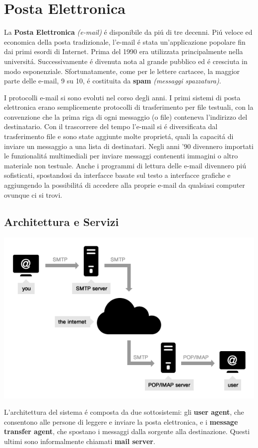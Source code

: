 \documentclass[12pt]{article}
\begin{document}
\clearpage
\section{Posta Elettronica}\label{posta-elettronica}
La \textbf{Posta Elettronica} \textit{(e-mail)} \'e disponibile da pi\'u di tre decenni. Pi\'u veloce ed economica della posta 
tradizionale, l'e-mail \'e stata un'applicazione popolare fin dai primi esordi di Internet. Prima del 1990 era utilizzata 
principalmente nella universit\'a. Successivamente \'e divenuta nota al grande pubblico ed \'e cresciuta in modo esponenziale. 
Sfortunatamente, come per le lettere cartacee, la maggior parte delle e-mail, 9 su 10, \'e costituita da \textbf{spam} 
\textit{(messaggi spazzatura)}.

I protocolli e-mail si sono evoluti nel corso  degli anni. I primi sistemi di posta elettronica erano semplicemente protocolli di 
trasferimento per file testuali, con la convenzione che la prima riga di ogni messaggio (o file) conteneva l'indirizzo del 
destinatario. Con il trascorrere del tempo l'e-mail si \'e diversificata dal trasferimento file e sono state aggiunte molte 
propriet\'a, quali la capacit\'a di inviare un messaggio a una lista di destinatari. Negli anni '90 divennero importati le 
funzionalit\'a multimediali per inviare messaggi contenenti immagini o altro materiale non testuale. Anche i programmi di lettura 
delle e-mail divennero pi\'u sofisticati, spostandosi da interfacce basate sul testo a interfacce grafiche e aggiungendo la 
possibilit\'a di accedere alla proprie e-mail da qualsiasi computer ovunque ci si trovi.

\subsection{Architettura e Servizi}\label{posta-elettronica-architettura-e-servizi}
\begin{center}
    \includegraphics[scale=0.5]{applicazione-img10.png}
\end{center}
L'architettura del sistema \'e composta da due sottosistemi: gli \textbf{user agent}, che consentono alle persone di leggere e 
inviare la posta elettronica, e i \textbf{message transfer agent}, che spostano i messaggi dalla sorgente alla destinazione. Questi 
ultimi sono informalmente chiamati \textbf{mail server}.
\end{document}
